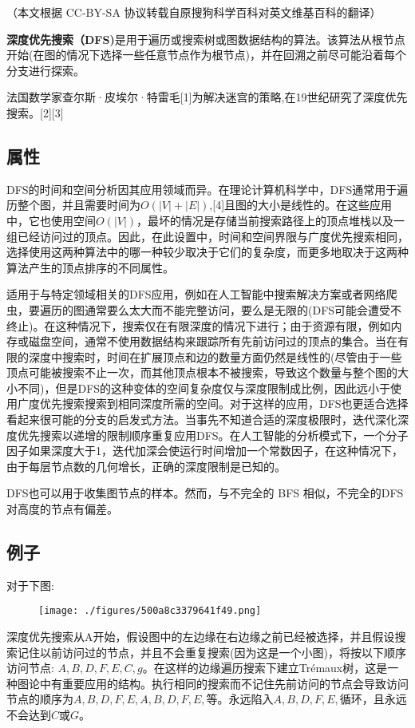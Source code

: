 
（本文根据 CC-BY-SA 协议转载自原搜狗科学百科对英文维基百科的翻译）

\textbf{深度优先搜索（DFS)}是用于遍历或搜索树或图数据结构的算法。该算法从根节点开始(在图的情况下选择一些任意节点作为根节点)，并在回溯之前尽可能沿着每个分支进行探索。

法国数学家查尔斯·皮埃尔·特雷毛[1]为解决迷宫的策略,在19世纪研究了深度优先搜索。[2][3]

\subsection{属性}
DFS的时间和空间分析因其应用领域而异。在理论计算机科学中，DFS通常用于遍历整个图，并且需要时间为$O(|V| + |E|)$,[4]且图的大小是线性的。在这些应用中，它也使用空间$O(|V|)$，最坏的情况是存储当前搜索路径上的顶点堆栈以及一组已经访问过的顶点。因此，在此设置中，时间和空间界限与广度优先搜索相同，选择使用这两种算法中的哪一种较少取决于它们的复杂度，而更多地取决于这两种算法产生的顶点排序的不同属性。

适用于与特定领域相关的DFS应用，例如在人工智能中搜索解决方案或者网络爬虫，要遍历的图通常要么太大而不能完整访问，要么是无限的(DFS可能会遭受不终止)。在这种情况下，搜索仅在有限深度的情况下进行；由于资源有限，例如内存或磁盘空间，通常不使用数据结构来跟踪所有先前访问过的顶点的集合。当在有限的深度中搜索时，时间在扩展顶点和边的数量方面仍然是线性的(尽管由于一些顶点可能被搜索不止一次，而其他顶点根本不被搜索，导致这个数量与整个图的大小不同)，但是DFS的这种变体的空间复杂度仅与深度限制成比例，因此远小于使用广度优先搜索搜索到相同深度所需的空间。对于这样的应用，DFS也更适合选择看起来很可能的分支的启发式方法。当事先不知道合适的深度极限时，迭代深化深度优先搜索以递增的限制顺序重复应用DFS。在人工智能的分析模式下，一个分子因子如果深度大于1，迭代加深会使运行时间增加一个常数因子，在这种情况下，由于每层节点数的几何增长，正确的深度限制是已知的。

DFS也可以用于收集图节点的样本。然而，与不完全的 BFS 相似，不完全的DFS对高度的节点有偏差。

\subsection{例子}
对于下图:
\begin{figure}[ht]
\centering
\texttt{[image: ./figures/500a8c3379641f49.png]}
\caption\label{fig_SDYXSS_1}
\end{figure}
深度优先搜索从A开始，假设图中的左边缘在右边缘之前已经被选择，并且假设搜索记住以前访问过的节点，并且不会重复搜索(因为这是一个小图)，将按以下顺序访问节点: $A,B,D,F,E,C,g$。在这样的边缘遍历搜索下建立Trémaux树，这是一种图论中有重要应用的结构。执行相同的搜索而不记住先前访问的节点会导致访问节点的顺序为$A,B,D,F,E,A,B,D,F,E,$等。永远陷入$A,B,D,F,E,$循环，且永远不会达到$C$或$G$。

